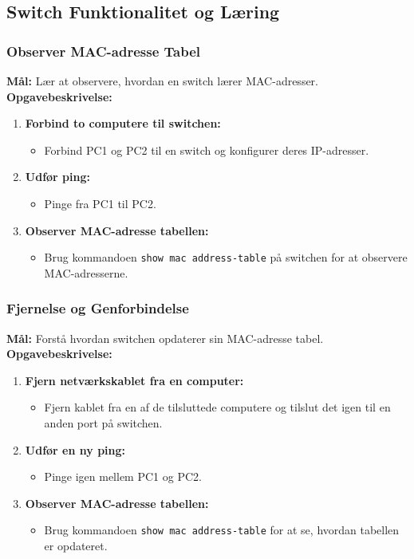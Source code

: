 \subsection{Switch Funktionalitet og Læring}
\subsubsection*{Observer MAC-adresse Tabel}
\textbf{Mål:} Lær at observere, hvordan en switch lærer MAC-adresser.
\newline\newline\noindent
\textbf{Opgavebeskrivelse:}
\begin{enumerate}
	\item \textbf{Forbind to computere til switchen:}
	\begin{itemize}
		\item Forbind PC1 og PC2 til en switch og konfigurer deres IP-adresser.
	\end{itemize}
	\item \textbf{Udfør ping:}
	\begin{itemize}
		\item Pinge fra PC1 til PC2.
	\end{itemize}
	\item \textbf{Observer MAC-adresse tabellen:}
	\begin{itemize}
		\item Brug kommandoen \texttt{show mac address-table} på switchen for at observere MAC-adresserne.
	\end{itemize}
\end{enumerate}

\subsubsection*{Fjernelse og Genforbindelse}
\textbf{Mål:} Forstå hvordan switchen opdaterer sin MAC-adresse tabel.
\newline\newline\noindent
\textbf{Opgavebeskrivelse:}
\begin{enumerate}
	\item \textbf{Fjern netværkskablet fra en computer:}
	\begin{itemize}
		\item Fjern kablet fra en af de tilsluttede computere og tilslut det igen til en anden port på switchen.
	\end{itemize}
	\item \textbf{Udfør en ny ping:}
	\begin{itemize}
		\item Pinge igen mellem PC1 og PC2.
	\end{itemize}
	\item \textbf{Observer MAC-adresse tabellen:}
	\begin{itemize}
		\item Brug kommandoen \texttt{show mac address-table} for at se, hvordan tabellen er opdateret.
	\end{itemize}
\end{enumerate}

